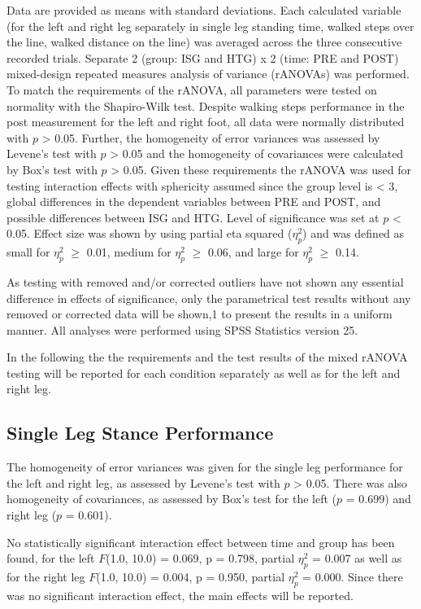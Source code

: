 Data are provided as means with standard deviations.
Each calculated variable (for the left and right leg separately in single leg standing time, walked steps over the line, walked distance on the line) was averaged across the three consecutive recorded trials.
Separate 2 (group: ISG and HTG) x 2 (time: PRE and POST) mixed-design repeated measures analysis of variance (rANOVAs) was performed.
To match the requirements of the rANOVA, all parameters were tested on normality with the Shapiro-Wilk test.
Despite walking steps performance in the post measurement for the left and right foot, all data were normally distributed with $p$ > 0.05.
Further, the homogeneity of error variances was assessed by Levene's test with $p$ > 0.05 and the homogeneity of covariances were calculated by Box's test with $p$ > 0.05.
Given these requirements the rANOVA was used for testing interaction effects with sphericity assumed since the group level is < 3, global differences in the dependent variables between PRE and POST, and possible differences between ISG and HTG.
Level of significance was set at $p$ < 0.05.
Effect size was shown by using partial eta squared ($\eta_{p}^{2}$) and was defined as small for $\eta_{p}^{2}$ $\geq$ 0.01, medium for $\eta_{p}^{2}$ $\geq$ 0.06, and large for $\eta_{p}^{2}$ $\geq$ 0.14.

As testing with removed and/or corrected outliers have not shown any essential difference in effects of significance, only the parametrical test results without any removed or corrected data will be shown,1 to present the results in a uniform manner.
All analyses were performed using SPSS Statistics version 25.

In the following the the requirements and the test results of the mixed rANOVA testing will be reported for each condition separately as well as for the left and right leg.

\subsection{Single Leg Stance Performance}
The homogeneity of error variances was given for the single leg performance for the left and right leg, as assessed by Levene's test with $p$ > 0.05.
There was also homogeneity of covariances, as assessed by Box's test for the left ($p$ = 0.699) and right leg ($p$ = 0.601).

No statistically significant interaction effect between time and group has been found, for the left $F$(1.0, 10.0) = 0.069, p = 0.798, partial $\eta_{p}^{2}$ = 0.007 as well as for the right leg $F$(1.0, 10.0) = 0.004, p = 0.950, partial $\eta_{p}^{2}$ = 0.000.
Since there was no significant interaction effect, the main effects will be reported.

